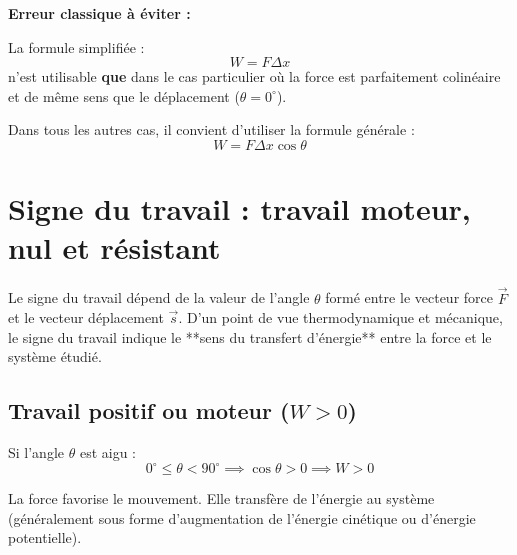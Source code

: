 \documentclass[11pt,openany]{book}
\begin{document}
\begin{important}
\textbf{Erreur classique à éviter :}

La formule simplifiée :
\[
W = F \Delta x
\]
n'est utilisable \textbf{que} dans le cas particulier où la force est parfaitement colinéaire et de même sens que le déplacement ($\theta = 0^\circ$).

Dans tous les autres cas, il convient d'utiliser la formule générale :
\[
\boxed{W = F \Delta x \cos\theta}
\]
\end{important}

\section{Signe du travail : travail moteur, nul et résistant}

Le signe du travail dépend de la valeur de l'angle $\theta$ formé entre le vecteur force $\vec{F}$ et le vecteur déplacement $\vec{s}$. D'un point de vue thermodynamique et mécanique, le signe du travail indique le **sens du transfert d'énergie** entre la force et le système étudié.

\subsection{Travail positif ou moteur ($W > 0$)}

Si l'angle $\theta$ est aigu :
\[
0^\circ \le \theta < 90^\circ \implies \cos\theta > 0 \implies \boxed{W > 0}
\]

La force favorise le mouvement. Elle transfère de l'énergie au système (généralement sous forme d'augmentation de l'énergie cinétique ou d'énergie potentielle).

\begin{center}
\end{center}
\end{document}
